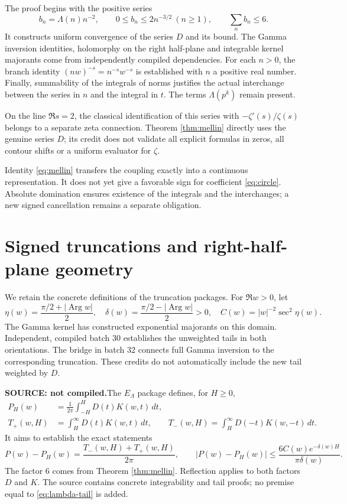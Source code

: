 \documentclass[11pt,a4paper]{article}
\theoremstyle{remark}
\newcommand{\Lam}{\Lambda}
\newcommand{\source}{\textbf{SOURCE: not compiled.}\space}
\DeclareMathOperator{\Arg}{Arg}
\begin{document}
The proof begins with the positive series
\[
b_n=\Lam(n)n^{-2},\qquad
0\le b_n\le 2n^{-3/2}\ (n\ge1),\qquad \sum_n b_n\le6.
\]
It constructs uniform convergence of the series $D$ and its bound.
The Gamma inversion identities, holomorphy on the right half-plane and
integrable kernel majorants come from independently compiled dependencies.
For each $n>0$, the branch identity $(nw)^{-s}=n^{-s}w^{-s}$ is established
with $n$ a positive real number. Finally, summability of the integrals of
norms justifies the actual interchange between the series in $n$ and the
integral in $t$. The terms $\Lam(p^k)$ remain present.

On the line $\Re s=2$, the classical identification of this series with
$-\zeta'(s)/\zeta(s)$ belongs to a separate zeta connection. Theorem
\ref{thm:mellin} directly uses the genuine series $D$; its credit does not
validate all explicit formulas in zeros, all contour shifts or a uniform
evaluator for $\zeta$.

Identity \eqref{eq:mellin} transfers the coupling exactly into a continuous
representation. It does not yet give a favorable sign for coefficient
\eqref{eq:circle}. Absolute domination ensures existence of the integrals
and the interchanges; a new signed cancellation remains a separate obligation.

\clearpage
\section{Signed truncations and right-half-plane geometry}\label{sec:tails}
We retain the concrete definitions of the truncation packages. For
$\Re w>0$, let
\begin{equation}\label{eq:Cdelta}
\eta(w)=\frac{\pi/2+|\Arg w|}{2},\quad
\delta(w)=\frac{\pi/2-|\Arg w|}{2}>0,\quad
C(w)=|w|^{-2}\sec^2\eta(w).
\end{equation}
The Gamma kernel has constructed exponential majorants on this domain.
Independent, compiled batch 30 establishes the unweighted tails in both
orientations. The bridge in batch 32 connects full Gamma inversion to the
corresponding truncation. These credits do not automatically include the
new tail weighted by $D$.

\source The $E_\Lam$ package defines, for $H\ge0$,
\begin{align}
P_H(w)&=\frac1{2\pi}\int_{-H}^{H}D(t)K(w,t)\,dt,\\
T_+(w,H)&=\int_H^\infty D(t)K(w,t)\,dt,\qquad
T_-(w,H)=\int_H^\infty D(-t)K(w,-t)\,dt.
\end{align}
It aims to establish the exact statements
\begin{equation}\label{eq:lambda-tail}
P(w)-P_H(w)=\frac{T_-(w,H)+T_+(w,H)}{2\pi},\qquad
|P(w)-P_H(w)|\le
\frac{6C(w)e^{-\delta(w)H}}{\pi\delta(w)}.
\end{equation}
The factor 6 comes from Theorem \ref{thm:mellin}. Reflection applies to both
factors $D$ and $K$. The source contains concrete integrability and tail
proofs; no premise equal to \eqref{eq:lambda-tail} is added.
\end{document}

